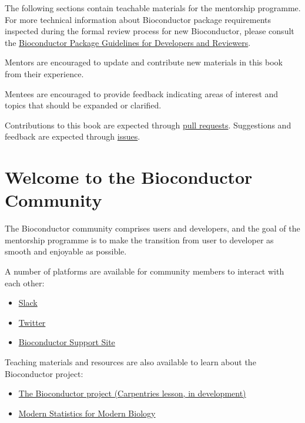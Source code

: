 \documentclass[
]{book}
\providecommand{\tightlist}{%
  \setlength{\itemsep}{0pt}\setlength{\parskip}{0pt}}
\begin{document}
The following sections contain teachable materials for the mentorship programme.
For more technical information about Bioconductor package requirements inspected during the formal review process for new Bioconductor, please consult the \href{http://contributions.bioconductor.org/}{Bioconductor Package Guidelines for Developers and Reviewers}.

Mentors are encouraged to update and contribute new materials in this book from their experience.

Mentees are encouraged to provide feedback indicating areas of interest and topics that should be expanded or clarified.

Contributions to this book are expected through \href{https://github.com/kevinrue/bioc-mentorship-docs/pulls}{pull requests}.
Suggestions and feedback are expected through \href{https://github.com/kevinrue/bioc-mentorship-docs/issues}{issues}.

\hypertarget{community}{%
\chapter{Welcome to the Bioconductor Community}\label{community}}

The Bioconductor community comprises users and developers, and the goal of the mentorship programme is to make the transition from user to developer as smooth and enjoyable as possible.

A number of platforms are available for community members to interact with each other:

\begin{itemize}
\tightlist
\item
  \href{https://bioc-community.herokuapp.com/}{Slack}
\item
  \href{https://twitter.com/Bioconductor}{Twitter}
\item
  \href{https://support.bioconductor.org/}{Bioconductor Support Site}
\end{itemize}

Teaching materials and resources are also available to learn about the Bioconductor project:

\begin{itemize}
\tightlist
\item
  \href{https://carpentries-incubator.github.io/bioc-project/}{The Bioconductor project (Carpentries lesson, in development)}
\item
  \href{https://www.huber.embl.de/msmb/course_spring_2020/index.html}{Modern Statistics for Modern Biology}
\end{itemize}
\end{document}
